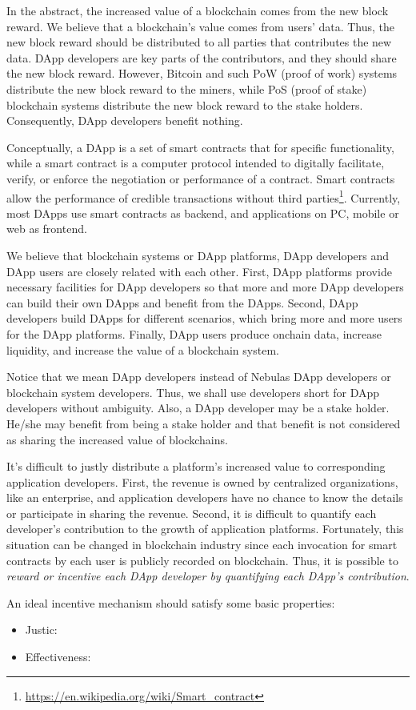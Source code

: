 In the abstract, the increased value of a blockchain comes from the new block
reward. We believe that a blockchain's value comes from users' data. Thus, the
new block reward should be distributed to all parties that contributes the
new data. DApp developers are key parts of the contributors, and they should
share the new block reward. However, Bitcoin and such PoW (proof
of work) systems distribute the new block reward
to the miners, while PoS (proof of stake) blockchain systems distribute the new
block reward to the stake holders. Consequently, DApp developers benefit
nothing.

Conceptually, a DApp is a set of smart contracts that for specific
functionality, while a smart contract is a computer protocol intended to
digitally facilitate, verify, or enforce the negotiation or performance of a
contract. Smart contracts allow the performance of credible transactions
without third
parties\footnote{\url{https://en.wikipedia.org/wiki/Smart\_contract}}.
Currently, most DApps use smart contracts as backend, and applications on PC,
mobile or web as frontend.

We believe that blockchain systems or DApp platforms, DApp developers and DApp
users are closely related with each other. First, DApp platforms provide
necessary facilities for DApp developers so that more and more DApp developers
can build their own DApps and benefit from the DApps. Second, DApp
developers build DApps for different scenarios, which bring more and more
users for the DApp platforms. Finally, DApp users produce onchain data,
increase liquidity, and increase the value of a blockchain system.

Notice that we mean DApp developers instead of Nebulas DApp developers or
blockchain system developers. Thus, we shall use developers short for DApp
developers without ambiguity. Also, a DApp developer may be a stake holder.
He/she may benefit from being a stake holder and that benefit is not considered
as sharing the increased value of blockchains.


It's difficult to justly distribute a platform's increased value to
corresponding application developers. First, the revenue is owned by
centralized organizations, like an enterprise, and application developers have
no chance to know the details or participate in sharing the revenue. Second, it
is difficult to quantify each developer's contribution to the growth of
application platforms. Fortunately, this situation can be changed in blockchain
industry since each invocation for smart contracts by each user is
publicly recorded on
blockchain. Thus, it is possible to \emph{reward or incentive each DApp developer by
quantifying each DApp's contribution}.

An ideal incentive mechanism should satisfy some basic properties:
\begin{itemize}
\item Justic:
\item Effectiveness:
\end{itemize}


